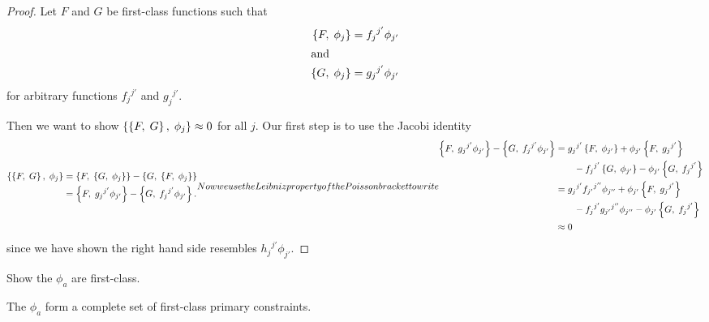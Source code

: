 \begin{proof}
Let $F$ and $G$ be first-class functions such that
\begin{subequations}
\begin{align}
\left\{F,\;\phi_{j}\right\} &= {f_{j}}^{j'}\phi_{j'}\\
\intertext{and}
\left\{G,\;\phi_{j}\right\} &= {g_{j}}^{j'}\phi_{j'}
\end{align}
\end{subequations}
for arbitrary functions ${f_{j}}^{j'}$ and ${g_{j}}^{j'}$.

Then we want to show
$\left\{\left\{F,\;G\right\},\;\phi_{j}\right\}\approx0$ for all
$j$. Our first step is to use the Jacobi identity
\begin{subequations}
\begin{align}
\PoissonBracket{\PoissonBracket{F}{G}}{\phi_{j}}&=
\PoissonBracket{F}{\PoissonBracket{G}{\phi_{j}}}
-\PoissonBracket{G}{\PoissonBracket{F}{\phi_{j}}}\\
&=\PoissonBracket{F}{{g_{j}}^{j'}\phi_{j'}}
-\PoissonBracket{G}{{f_{j}}^{j'}\phi_{j'}}.
\end{align}
Now we use the Leibniz property of the Poisson bracket to write
\begin{align}
\PoissonBracket{F}{{g_{j}}^{j'}\phi_{j'}}
-\PoissonBracket{G}{{f_{j}}^{j'}\phi_{j'}}
&= {g_{j}}^{j'}\PoissonBracket{F}{\phi_{j'}}
   +\phi_{j'}\PoissonBracket{F}{{g_{j}}^{j'}}\nonumber\\
&\qquad-{f_{j}}^{j'}\PoissonBracket{G}{\phi_{j'}}
   -\phi_{j'}\PoissonBracket{G}{{f_{j}}^{j'}}\\
&= {g_{j}}^{j'}{f_{j'}}^{j''}\phi_{j''}
   +\phi_{j'}\PoissonBracket{F}{{g_{j}}^{j'}}\nonumber\\
&\qquad-{f_{j}}^{j'}{g_{j'}}^{j''}\phi_{j''}
   -\phi_{j'}\PoissonBracket{G}{{f_{j}}^{j'}}\\
&\weakEq 0
\end{align}
\end{subequations}
since we have shown the right hand side resembles ${h_{j}}^{j'}\phi_{j'}$.
\end{proof}

\begin{xca}
Show the $\phi_{a}$ are first-class.
\end{xca}

\begin{theorem}\label{thm:constrained:phi-a-complete-first-class-primary-constraints}
The $\phi_{a}$ form a complete set of first-class primary
constraints.
\end{theorem}

